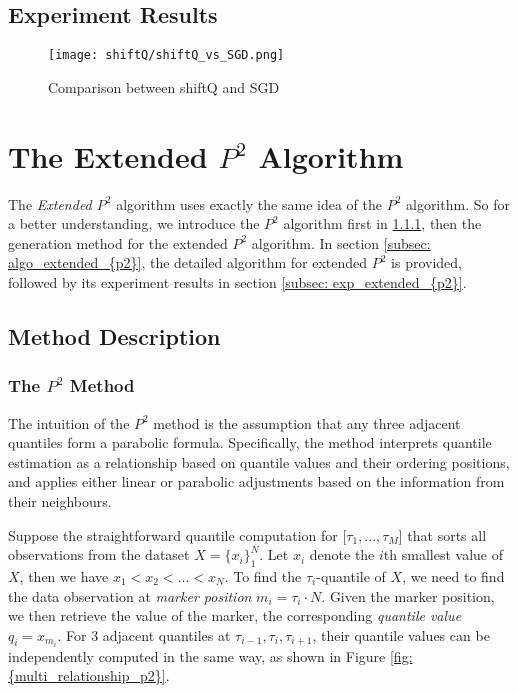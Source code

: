 \subsection{Experiment Results}

\begin{figure*}[h!]
	\texttt{[image: shiftQ/shiftQ\_vs\_SGD.png]}
	\caption{Comparison between shiftQ and SGD}
\end{figure*}


\section{The Extended $P^2$ Algorithm}
\label{sec: multi_{p2}}

The \textit{Extended $P^2$} algorithm\cite{raatikainenSequentialProcedureSimultaneous1993} uses exactly the same idea of the $P^2$ algorithm\cite{jainP2AlgorithmDynamic1985}. So for a better understanding, we introduce the $P^2$ algorithm first in \ref{subsubsec: description_{p2}}, then the generation method for the extended $P^2$ algorithm.
In section \ref{subsec: algo_extended_{p2}}, the detailed algorithm for extended $P^2$ is provided, followed by its experiment results in section \ref{subsec: exp_extended_{p2}}.

\subsection{Method Description}

\subsubsection{The $P^2$ Method}
\label{subsubsec: description_{p2}}

The intuition of the $P^2$ method is the assumption that any three adjacent quantiles form a parabolic formula.
Specifically, the method interprets quantile estimation as a relationship based on quantile values and their ordering positions, and applies either linear or parabolic adjustments based on the information from their neighbours.

Suppose the straightforward quantile computation for [$\tau_1, ..., \tau_M$] that sorts all observations from the dataset $X = \{x_i\}^N_1$. Let $x_i$ denote the $i$th smallest value of $X$, then we have $x_1 < x_2 < ... < x_N$. 
To find the $\tau_i$-quantile of $X$, we need to find the data observation at \textit{marker position} $m_i = \tau_i \cdot N$. Given the marker position, we then retrieve the value of the marker, the corresponding \textit{quantile value} $q_i = x_{m_i}$. 
For 3 adjacent quantiles at $\tau_{i-1}, \tau_i, \tau_{i+1}$, their quantile values can be independently computed in the same way, as shown in Figure \ref{fig: {multi_relationship_p2}}.

